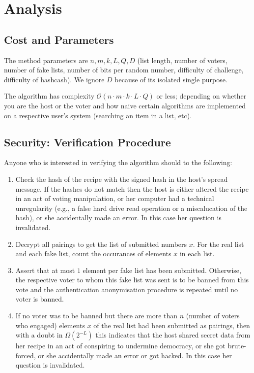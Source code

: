 \documentclass{article}
\newcommand{\cO}{\mathcal{O}\xspace}
\theoremstyle{definition}
\begin{document}
	\section{Analysis}
	
	\subsection{Cost and Parameters}
	The method parameters are $n,m,k,L,Q,D$ (list length, number of voters, number of fake lists, number of bits per random number, difficulty of challenge, difficulty of hashcash). We ignore $D$ because of its isolated single purpose.
	
	The algorithm has complexity $\cO(n \cdot m \cdot k \cdot L \cdot Q)$ or less; depending on whether you are the host or the voter and how naive certain algorithms are implemented on a respective user's system (searching an item in a list, etc).
	
	\subsection{Security: Verification Procedure}
	Anyone who is interested in verifying the algorithm should to the following:
	\begin{enumerate}
		\item Check the hash of the recipe with the signed hash in the host's spread message. If the hashes do not match then the host is either altered the recipe in an act of voting manipulation, or her computer had a technical unregularity (e.g., a false hard drive read operation or a miscalucation of the hash), or she accidentally made an error. In this case her question is invalidated.
		\item Decrypt all pairings to get the list of submitted numbers $x$. For the real list and each fake list,  count the occurances of elements $x$ in each list.
		\item Assert that at most $1$ element per fake list has been submitted. Otherwise, the respective voter to whom this fake list was sent is to be banned from this vote and the authentication anonymisation procedure is repeated until no voter is banned.
		\item If no voter was to be banned but there are more than $n$ (number of voters who engaged) elements $x$ of the real list had been submitted as pairings, then with a doubt in $\Omega(2^{-L})$ this indicates that the host shared secret data from her recipe in an act of conspiring to undermine democracy, or she got brute-forced, or she accidentally made an error or got hacked. In this case her question is invalidated.
	\end{enumerate}
	
\end{document}

